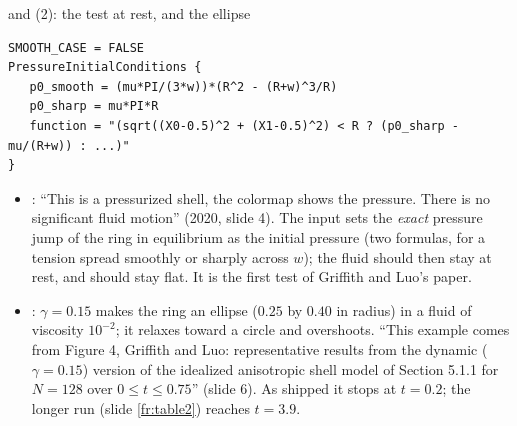 \documentclass[aspectratio=169,11pt]{beamer}
\begin{document}
\begin{frame}[fragile]{ and  (2): the test at rest, and the ellipse}
\label{fr:ex01b}
\footnotesize
\begin{lstlisting}[style=inputtiny]
SMOOTH_CASE = FALSE
PressureInitialConditions {
   p0_smooth = (mu*PI/(3*w))*(R^2 - (R+w)^3/R)
   p0_sharp = mu*PI*R
   function = "(sqrt((X0-0.5)^2 + (X1-0.5)^2) < R ? (p0_sharp - mu/(R+w)) : ...)"
}
\end{lstlisting}
\begin{itemize}
  \item {}: ``This is a pressurized shell, the colormap shows the pressure. There is no significant fluid motion'' (2020, slide 4). The input sets the \emph{exact} pressure jump of the ring in equilibrium as the initial pressure (two formulas, for a tension spread smoothly or sharply across $w$); the fluid should then stay at rest, and  should stay flat. It is the first test of Griffith and Luo's paper.
  \item {}: $\gamma = 0.15$ makes the ring an ellipse ($0.25$ by $0.40$ in radius) in a fluid of viscosity $10^{-2}$; it relaxes toward a circle and overshoots. ``This example comes from Figure 4, Griffith and Luo: representative results from the dynamic ($\gamma = 0.15$) version of the idealized anisotropic shell model of Section 5.1.1 for $N = 128$ over $0 \le t \le 0.75$'' (slide 6). As shipped it stops at $t = 0.2$; the longer run (slide \ref{fr:table2}) reaches $t = 3.9$.
\end{itemize}
\end{frame}
\end{document}
